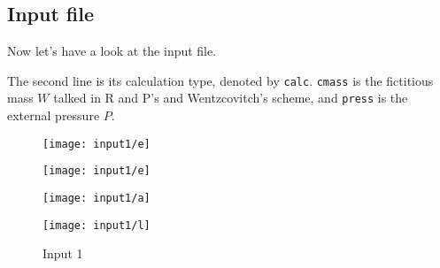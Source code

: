 
\subsection{Input file}

Now let's have a look at the input file.

The second line is its calculation type, denoted by
\texttt{calc}. \texttt{cmass} is the fictitious mass $W$ talked
in R and P's and Wentzcovitch's scheme, and \texttt{press} is the
external pressure $P$.

\begin{figure}[h]
	\centering
	\label{fig:input1}
	\caption{Input 1}
	\begin{minipage}[t]{0.45\textwidth}
		\texttt{[image: input1/e]}
		\subcaption{}
		\label{fig:input1:e}
	\end{minipage}
	\hfil
	\begin{minipage}[t]{0.45\textwidth}
		\texttt{[image: input1/e]}
		\subcaption{}
		\label{fig:input1:ee}
	\end{minipage}
	\hfil
	\vfill
	\begin{minipage}[t]{0.45\textwidth}
		\texttt{[image: input1/a]}
		\subcaption{}
		\label{fig:input1:a}
	\end{minipage}
	\hfil
	\begin{minipage}[t]{0.45\textwidth}
		\texttt{[image: input1/l]}
		\subcaption{}
		\label{fig:input1:l}
	\end{minipage}
\end{figure}
